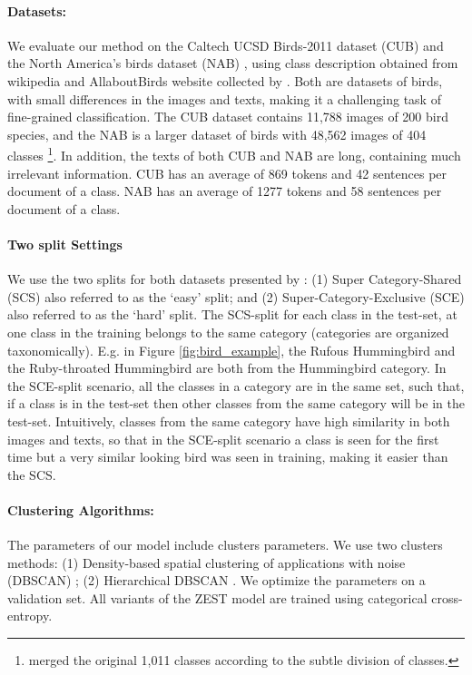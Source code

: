 \documentclass[11pt,a4paper]{article}
\begin{document}
\paragraph{Datasets:}  We evaluate our method on the Caltech UCSD Birds-2011 dataset (CUB) \citet{wah2011caltech} and the North America’s birds dataset (NAB) \cite{van2015building}, using class description obtained from wikipedia and AllaboutBirds website \cite{AllaboutBirds} collected by \citet{elhoseiny2017link}. 
Both are datasets of birds, with small differences in the images and texts, making it a challenging task of fine-grained classification. The CUB dataset contains 11,788 images of 200 bird species, and the NAB
is a larger dataset of birds with 48,562 images of 404 classes \footnote{\citet{elhoseiny2017link} merged the original 1,011 classes according to the subtle division of classes.}.
In addition, the texts of both CUB and NAB are long, containing much irrelevant information. CUB has an average of 869 tokens and 42 sentences per document of a class. NAB has an average of 1277 tokens and 58 sentences per document of a class. 

\paragraph{Two split Settings} We use the two splits for both datasets presented by \citet{elhoseiny2017link}: (1) Super Category-Shared (SCS) also referred to as the \enquote*{easy} split; and (2) Super-Category-Exclusive (SCE) also referred to as the \enquote*{hard} split. The SCS-split for each class in the test-set, at one class in the training belongs to the same category (categories are organized taxonomically). E.g. in Figure \ref{fig:bird_example}, the Rufous Hummingbird and the Ruby-throated Hummingbird are both from the Hummingbird category. In the SCE-split scenario, all the classes in a category are in the same set, such that, if a class is in the test-set then other classes from the same category will be in the test-set. Intuitively, classes from the same category have high similarity in both images and texts, so that in the SCE-split scenario a class is seen for the first time but a very similar looking bird was seen in training, making it easier than the SCS.

\paragraph{Clustering Algorithms:}
The parameters of our model include clusters parameters.
We use two clusters methods: (1) Density-based spatial clustering of applications with noise (DBSCAN) \citep{ester1996density}; (2) Hierarchical DBSCAN \citep{mcinnes2017hdbscan}.
We optimize the parameters on a validation set. All variants of the ZEST model are trained using categorical cross-entropy.
\end{document}
